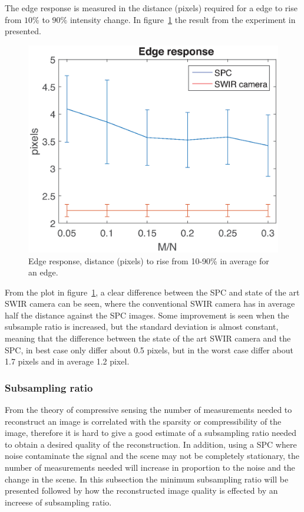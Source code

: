 The edge response is measured in the distance (pixels) required for a edge to rise from $10\%$ to $90\%$ intensity change. In figure~\ref{fig:rise} the result from the experiment in presented. 

\begin{figure}[H]
    \centering
    \includegraphics[width=0.7\linewidth]{result/mtf/Rise10_90.eps}
    \caption{Edge response, distance (pixels) to rise from 10-90\% in average for an edge.}
    \label{fig:rise}
\end{figure}

From the plot in figure~\ref{fig:rise}, a clear difference between the SPC and state of the art SWIR camera can be seen, where the conventional SWIR camera has in average half the distance against the SPC images. Some improvement is seen when the subsample ratio is increased, but the standard deviation is almost constant, meaning that the difference between the state of the art SWIR camera and the SPC, in best case only differ about 0.5 pixels, but in the worst case differ about 1.7 pixels and in average 1.2 pixel.

\subsubsection{Subsampling ratio}
\label{sec:measurements}
From the theory of compressive sensing the number of measurements needed to reconstruct an image is correlated with the sparsity or compressibility of the image, therefore it is hard to give a good estimate of a subsampling ratio needed to obtain a desired quality of the reconstruction. In addition, using a SPC where noise contaminate the signal and the scene may not be completely stationary, the number of measurements needed will increase in proportion to the noise and the change in the scene. In this subsection the minimum subsampling ratio will be presented followed by how the reconstructed image quality is effected by an increese of subsampling ratio.\\[0.1in]


